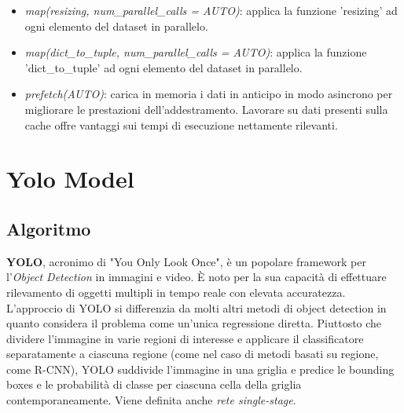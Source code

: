 \documentclass{report}
\begin{document}
\begin{itemize}
\begin{itemize}
\begin{itemize}
\item {\itshape map(resizing, num\_parallel\_calls = AUTO)}: applica la funzione 'resizing' ad ogni elemento del dataset in parallelo.

\item {\itshape map(dict\_to\_tuple, num\_parallel\_calls = AUTO)}: applica la funzione 'dict\_to\_tuple' ad ogni elemento del dataset in parallelo.

\item {\itshape prefetch(AUTO)}: carica in memoria i dati in anticipo in modo asincrono per migliorare le prestazioni dell'addestramento. Lavorare su dati presenti sulla cache offre vantaggi sui tempi di esecuzione nettamente rilevanti.
\end{itemize}
\end{itemize}

\end{itemize}
\newpage

\section{Yolo Model}
\subsection{Algoritmo}
\textbf{YOLO}, acronimo di "You Only Look Once", è un popolare framework per l'{\itshape Object Detection} in immagini e video. È noto per la sua capacità di effettuare rilevamento di oggetti multipli in tempo reale con elevata accuratezza.\\
L'approccio di YOLO si differenzia da molti altri metodi di object detection in quanto considera il problema come un'unica regressione diretta. Piuttosto che dividere l'immagine in varie regioni di interesse e applicare il classificatore separatamente a ciascuna regione (come nel caso di metodi basati su regione, come R-CNN), YOLO suddivide l'immagine in una griglia e predice le bounding boxes e le probabilità di classe per ciascuna cella della griglia contemporaneamente. Viene definita anche {\itshape rete single-stage}.\\
\end{document}

